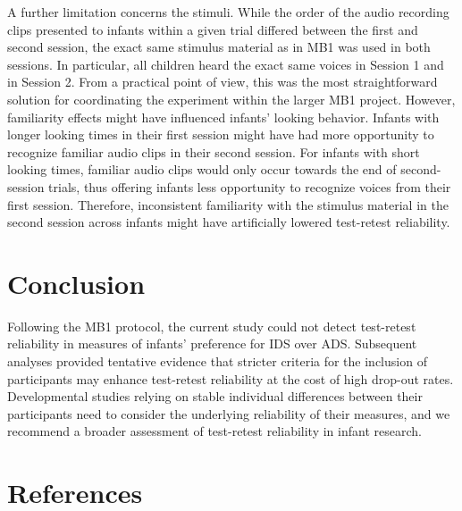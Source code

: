 \documentclass[
  man,floatsintext]{apa6}
\begin{document}
A further limitation concerns the stimuli. While the order of the audio recording clips presented to infants within a given trial differed between the first and second session, the exact same stimulus material as in MB1 was used in both sessions.
In particular, all children heard the exact same voices in Session 1 and in Session 2.
From a practical point of view, this was the most straightforward solution for coordinating the experiment within the larger MB1 project.
However, familiarity effects might have influenced infants' looking behavior.
Infants with longer looking times in their first session might have had more opportunity to recognize familiar audio clips in their second session.
For infants with short looking times, familiar audio clips would only occur towards the end of second-session trials, thus offering infants less opportunity to recognize voices from their first session.
Therefore, inconsistent familiarity with the stimulus material in the second session across infants might have artificially lowered test-retest reliability.

\hypertarget{conclusion}{%
\section{Conclusion}\label{conclusion}}

Following the MB1 protocol, the current study could not detect test-retest reliability in measures of infants' preference for IDS over ADS.
Subsequent analyses provided tentative evidence that stricter criteria for the inclusion of participants may enhance test-retest reliability at the cost of high drop-out rates.
Developmental studies relying on stable individual differences between their participants need to consider the underlying reliability of their measures, and we recommend a broader assessment of test-retest reliability in infant research.

\newpage

\hypertarget{references}{%
\section{References}\label{references}}

\begingroup
\setlength{\parindent}{-0.5in}
\setlength{\leftskip}{0.5in}
\end{document}

